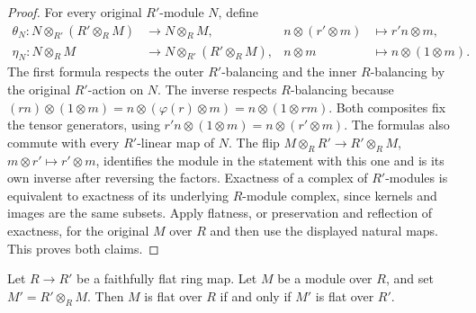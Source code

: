 \begin{proof}
For every original $R'$-module $N$, define
$$
\begin{aligned}
\theta_N:N\otimes_{R'}(R'\otimes_R M)&\longrightarrow N\otimes_R M,
&n\otimes(r'\otimes m)&\longmapsto r'n\otimes m,\\
\eta_N:N\otimes_R M&\longrightarrow N\otimes_{R'}(R'\otimes_R M),
&n\otimes m&\longmapsto n\otimes(1\otimes m).
\end{aligned}
$$
The first formula respects the outer $R'$-balancing and the
inner $R$-balancing by the original $R'$-action on $N$.
The inverse respects $R$-balancing because
$(rn)\otimes(1\otimes m)=n\otimes(\varphi(r)\otimes m)
=n\otimes(1\otimes rm)$. Both composites fix the tensor
generators, using $r'n\otimes(1\otimes m)=n\otimes(r'\otimes m)$.
The formulas also commute with every $R'$-linear map of $N$.
The flip $M\otimes_R R'\to R'\otimes_R M$, $m\otimes r'\mapsto r'\otimes m$,
identifies the module in the statement with this one and is
its own inverse after reversing the factors. Exactness of a
complex of $R'$-modules is equivalent to exactness of its
underlying $R$-module complex, since kernels and images are
the same subsets. Apply flatness, or preservation and
reflection of exactness, for the original $M$ over $R$ and
then use the displayed natural maps. This proves both claims.
\end{proof}

\begin{lemma}
\label{editorial-source-lemma-flatness-descends}
Let $R \to R'$ be a faithfully flat ring map.
Let $M$ be a module over $R$, and set $M' = R' \otimes_R M$.
Then $M$ is flat over $R$ if and only if $M'$ is flat over $R'$.
\end{lemma}

